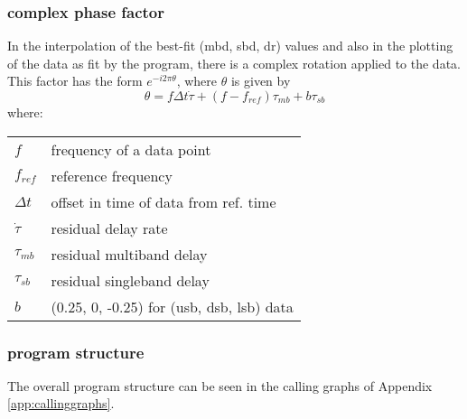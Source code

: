 \subsubsection{complex phase factor}
In the interpolation of the best-fit (mbd, sbd, dr) values and also
in the plotting of the data as fit by the program, there is
a complex rotation applied to the data. This factor has
the form $e^{-i 2 \pi \theta}$, where $\theta$ is given by
\begin{equation}
        \theta = f \Delta t \dot{\tau} + (f - f_{ref}) \tau_{mb} + b \tau_{sb}
\end{equation}
where:

\begin{tabular}{ll}
    $f$         & frequency of a data point \\
    $f_{ref}$   & reference frequency \\
    $\Delta t$  & offset in time of data from ref. time \\
    $\dot{\tau}$ & residual delay rate \\
    $\tau_{mb}$ & residual multiband delay \\
    $\tau_{sb}$ & residual singleband delay \\
    $b$         & (0.25, 0, -0.25) for (usb, dsb, lsb) data \\
\end{tabular}
\subsubsection{program structure}
The overall program structure can be seen in the calling
graphs of Appendix \ref{app:callinggraphs}.
